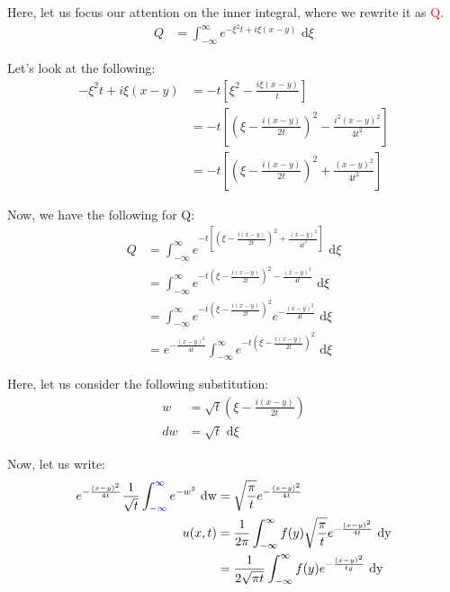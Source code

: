 \begin{enumerate}
  Here, let us focus our attention on the inner integral, where we rewrite it as \textcolor{red}{Q}.
  \begin{align}
    Q & = \int^\infty_{-\infty} e^{-\xi^2 t + i\xi(x - y)} \text{ d}\xi
  \end{align}

  Let's look at the following:
  \begin{align}
    -\xi^2 t + i\xi(x - y) & = -t\left[ \xi^2 - \frac{i \xi(x - y)}{t}\right]\\
    & = -t \left[ \left(\xi - \frac{i(x - y)}{2t}\right)^2 - \frac{i^2(x - y)^2}{4t^2} \right]\\
    & = -t \left[ \left(\xi - \frac{i(x - y)}{2t}\right)^2 + \frac{(x - y)^2}{4t^2} \right]
  \end{align}

  Now, we have the following for Q:
  \begin{align}
    Q & = \int^\infty_{-\infty} e^{-t \left[ \left(\xi - \frac{i(x - y)}{2t}\right)^2 + \frac{(x - y)^2}{4t^2} \right]} \text{ d}\xi\\
    & = \int^\infty_{-\infty} e^{-t\left( \xi - \frac{i(x - y)}{2t}\right)^2 - \frac{(x - y)^2}{4t}} \text{ d}\xi\\
    & = \int^\infty_{-\infty} e^{-t \left(\xi - \frac{i(x - y)}{2t}\right)^2} e^{- \frac{(x - y)^2}{4t}} \text{ d}\xi\\
    & = e^{- \frac{(x - y)^2}{4t}} \int^\infty_{-\infty} e^{-t \left(\xi - \frac{i(x - y)}{2t}\right)^2} \text{ d}\xi
  \end{align}

  Here, let us consider the following substitution:
  \color{blue}
  \begin{align}
    w & = \sqrt t \left( \xi - \frac{i(x - y)}{2t}\right)\\
    dw & = \sqrt t \text{ d}\xi
  \end{align}
  \color{black}

  Now, let us write:
  \begin{align}
    e^{- \frac{(x - y)^2}{4t}} \frac{1}{\sqrt t} \int^{\textcolor{blue}{\infty}}_{\textcolor{blue}{-\infty}} e^{-w^2} \text{ dw}
    & = \sqrt{\frac{\pi}{t}} e^{- \frac{(x - y)^2}{4t}}\\
    u(x, t) & = \frac{1}{2 \pi} \int^\infty_{- \infty} f(y) \sqrt{\frac{\pi}{t}} e^{- \frac{(x - y)^2}{4t}} \text{ dy}\\
    & = \frac{1}{2 \sqrt{\pi t}} \int^\infty_{-\infty} f(y) e^{- \frac{(x - y)^2}{ty}} \text{ dy}
  \end{align}
\end{enumerate}

